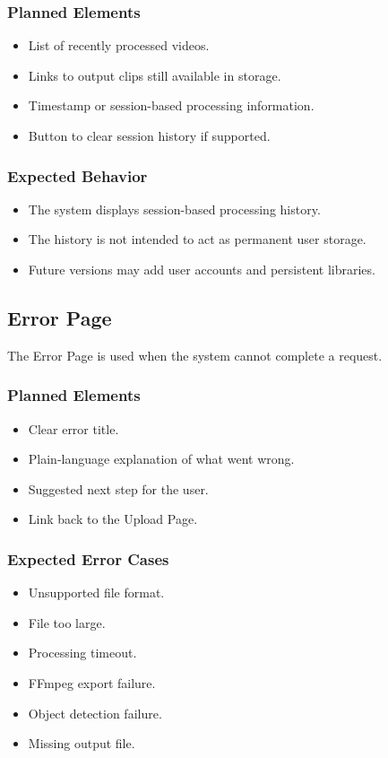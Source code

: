 \documentclass[12pt]{article}
\begin{document}
\subsubsection*{Planned Elements}
\begin{itemize}[noitemsep]
    \item List of recently processed videos.
    \item Links to output clips still available in storage.
    \item Timestamp or session-based processing information.
    \item Button to clear session history if supported.
\end{itemize}

\subsubsection*{Expected Behavior}
\begin{itemize}[noitemsep]
    \item The system displays session-based processing history.
    \item The history is not intended to act as permanent user storage.
    \item Future versions may add user accounts and persistent libraries.
\end{itemize}

\subsection{Error Page}
The Error Page is used when the system cannot complete a request.

\subsubsection*{Planned Elements}
\begin{itemize}[noitemsep]
    \item Clear error title.
    \item Plain-language explanation of what went wrong.
    \item Suggested next step for the user.
    \item Link back to the Upload Page.
\end{itemize}

\subsubsection*{Expected Error Cases}
\begin{itemize}[noitemsep]
    \item Unsupported file format.
    \item File too large.
    \item Processing timeout.
    \item FFmpeg export failure.
    \item Object detection failure.
    \item Missing output file.
\end{itemize}
\end{document}
